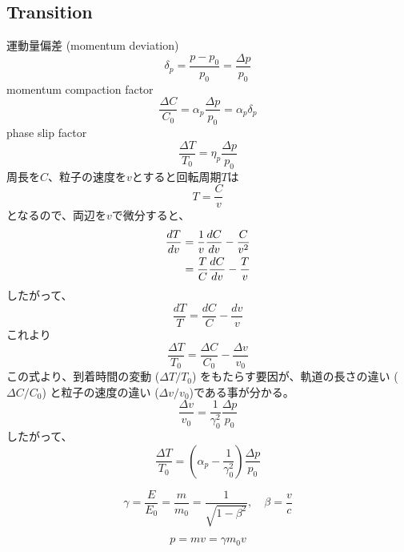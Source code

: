 \documentclass[10pt,a4paper]{ltjsarticle}
\begin{document}
\subsection{Transition}
運動量偏差 (momentum deviation)
\begin{equation}
    \delta_p = \frac{p-p_0}{p_0}=\frac{\Delta p}{p_0}
\end{equation}
%
momentum compaction factor
%
\begin{equation}
    \frac{\Delta C}{C_0}=\alpha_p\frac{\Delta p}{p_0}=\alpha_p\delta_p
\end{equation}
%
phase slip factor
\begin{equation}
    \frac{\Delta T}{T_0}=\eta_p\frac{\Delta p}{p_0}
\end{equation}
%
周長を$C$、粒子の速度を$v$とすると回転周期$T$は
%
\begin{equation}
    T=\frac{C}{v}
\end{equation}
%
となるので、両辺を$v$で微分すると、
%
\begin{align}
    \frac{dT}{dv} &= \frac{1}{v}\frac{dC}{dv}-\frac{C}{v^2} \notag \\
    & = \frac{T}{C}\frac{dC}{dv} - \frac{T}{v}
\end{align}
%
したがって、
%
\begin{equation}
    \frac{dT}{T} = \frac{dC}{C} - \frac{dv}{v}
\end{equation}
%
これより
%
\begin{equation}
    \frac{\Delta T}{T_0} = \frac{\Delta C}{C_0} - \frac{\Delta v}{v_0}
\end{equation}
%
この式より、到着時間の変動 ($\Delta T/T_0$) をもたらす要因が、軌道の長さの違い ($\Delta C/C_0$) と粒子の速度の違い ($\Delta v/v_0$)である事が分かる。
%
\begin{equation}
    \frac{\Delta v}{v_0}=\frac{1}{\gamma_0^2}\frac{\Delta p}{p_0}
    \label{delta_v}
\end{equation}
%
したがって、
%
\begin{equation}
    \frac{\Delta T}{T_0} = \left(\alpha_p - \frac{1}{\gamma_0^2}\right)\frac{\Delta p}{p_0}
\end{equation}
%
\begin{tcolorbox}[title=相対論のおさらい]
    \begin{equation}
        \gamma = \frac{E}{E_0}=\frac{m}{m_0}=\frac{1}{\sqrt{1-\beta^2}}, \quad \beta = \frac{v}{c} \tag{A.1}
    \end{equation}

    \begin{equation}
        p = mv = \gamma m_0 v \tag{A.2}
    \end{equation}
\end{tcolorbox}
\end{document}
